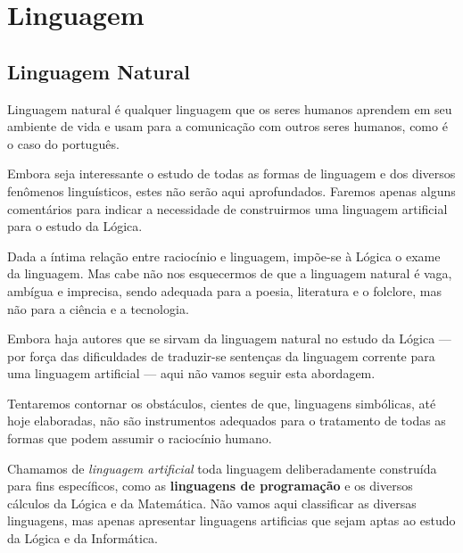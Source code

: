 \documentclass[
	14pt,				%
	twoside,			%
	a4paper,			%
	english,			%
	french,				%
	spanish,			%
	brazil,				%
    ]{abntex2}
\begin{document}
\pagestyle{plain}

\chapter{Linguagem}
\section{Linguagem Natural}

\thispagestyle{plain}


Linguagem natural é qualquer linguagem que os seres humanos aprendem em seu
ambiente de vida e usam para a comunicação com outros seres humanos, como é o
caso do português.

Embora seja interessante o estudo de todas as formas de linguagem e dos diversos
fenômenos linguísticos, estes não serão aqui aprofundados. Faremos apenas alguns
comentários para indicar a necessidade de construirmos uma linguagem artificial
para o estudo da Lógica.

Dada a íntima relação entre raciocínio e linguagem, impõe-se à Lógica o exame da linguagem.
Mas cabe não nos esquecermos de que a linguagem natural é vaga, ambígua e imprecisa, sendo adequada para a poesia, literatura e o folclore, mas não para a ciência e a tecnologia.

Embora haja autores que se sirvam da linguagem natural no estudo da Lógica --- por força das dificuldades de traduzir-se sentenças da linguagem corrente para uma linguagem artificial --- aqui não vamos seguir esta abordagem.

Tentaremos contornar os obstáculos, cientes de que, linguagens simbólicas, até hoje elaboradas, não são instrumentos adequados para o tratamento de todas as formas que podem assumir o raciocínio humano.

\newpage

Chamamos de \emph{linguagem artificial} %
toda linguagem deliberadamente construída para fins específicos, como as \textbf{linguagens de programação} e os diversos cálculos da Lógica e da Matemática.
Não vamos aqui classificar as diversas linguagens, mas apenas apresentar linguagens artificias que sejam aptas ao estudo da Lógica e da Informática.
\end{document}
